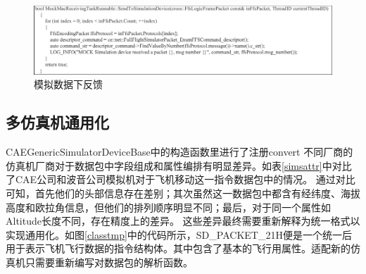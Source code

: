\begin{figure}[h!]
    \begin{center}
        \includegraphics[width=\textwidth]{pictures/code10.pdf}
        \caption{模拟数据下反馈}
        \label{feedbackmock}
    \end{center}
\end{figure}
\subsection{多仿真机通用化}
CAEGenericSimulatorDeviceBase中的构造函数里进行了注册convert
不同厂商的仿真机厂商对于数据包中字段组成和属性编排有明显差异。如表\ref{simsattr}中对比了CAE公司和波音公司模拟机对于飞机移动这一指令数据包中的情况。
通过对比可知，首先他们的头部信息存在差别；其次虽然这一数据包中都含有经纬度、海拔高度和欧拉角信息，但他们的排列顺序明显不同；最后，对于同一个属性如Altitude长度不同，存在精度上的差异。
这些差异最终需要重新解释为统一格式以实现通用化。如图\ref{classtmp}中的代码所示，SD\_PACKET\_21H便是一个统一后用于表示飞机飞行数据的指令结构体。其中包含了基本的飞行用属性。适配新的仿真机只需要重新编写对数据包的解析函数。
